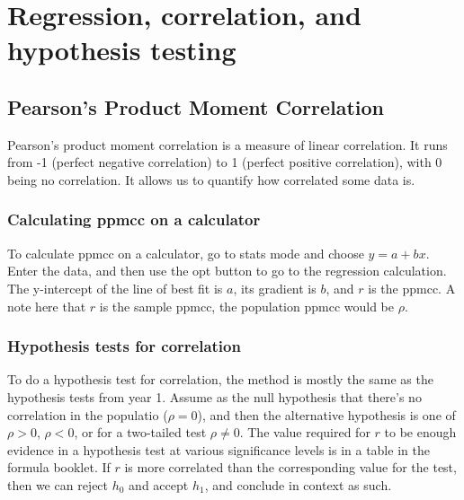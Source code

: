 \section{Regression, correlation, and hypothesis testing}
\subsection{Pearson's Product Moment Correlation}
Pearson's product moment correlation is a measure of linear correlation. It runs from -1 (perfect negative correlation) to 1 (perfect positive correlation), with 0 being no correlation. It allows us to quantify how correlated some data is.

\subsubsection{Calculating ppmcc on a calculator}
To calculate ppmcc on a calculator, go to stats mode and choose $y=a+bx$. Enter the data, and then use the opt button to go to the regression calculation. The y-intercept of the line of best fit is $a$, its gradient is $b$, and $r$ is the ppmcc. A note here that $r$ is the sample ppmcc, the population ppmcc would be $\rho$.

\subsubsection{Hypothesis tests for correlation}
To do a hypothesis test for correlation, the method is mostly the same as the hypothesis tests from year 1. Assume as the null hypothesis that there's no correlation in the populatio ($\rho = 0$), and then the alternative hypothesis is one of $\rho > 0$, $\rho < 0$, or for a two-tailed test $\rho \neq 0$. The value required for $r$ to be enough evidence in a hypothesis test at various significance levels is in a table in the formula booklet. If $r$ is more correlated than the corresponding value for the test, then we can reject $h_0$ and accept $h_1$, and conclude in context as such.
